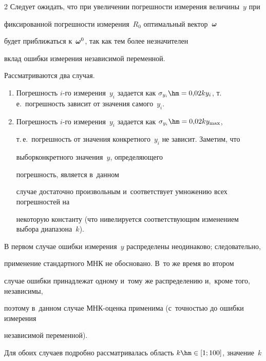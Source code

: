 \begin{multicols}{2}
Следует ожидать, что при увеличении погрешности измерения величины~$y$ при

фиксированной погрешности измерения~$R_0$ оптимальный вектор~$\boldsymbol{\omega}$

будет приближаться к~$\boldsymbol{\omega}^0$, так как тем более незначителен

вклад ошибки измерения независимой переменной.



Рассматриваются два случая.

\begin{enumerate}

  \item Погрешность $i$-го измерения~$y_i$ задается как $\sigma_{y_i} \hm= 

0{,}02ky_i$, т.\,е.\     погрешность зависит от значения самого~$y_i$.

  \item Погрешность $i$-го измерения~$y_i$ задается как $\sigma_{y_i} \hm= 

0{,}02ky_{\max}$,

    т.\,е.\ погрешность от значения конкретного~$y_i$ не зависит. Заметим, что 

выбор\linebreak конкретного значения~$y$, определяющего %

погрешность, является в~данном 

случае  достаточ\-но произвольным и~соответствует умножению всех погрешностей на 

некоторую константу     (что нивелируется соответствующим изменением выбора диапазона~$k$).

\end{enumerate}



В первом случае ошибки измерения~$y$ распределены неодинаково; следовательно, 

применение стандартного МНК не обосно\-ва\-но. В~то же время во втором 

случае ошибки принадлежат одному и~тому же распределению и,~кроме того, независимы, 

поэтому в~данном случае МНК-оцен\-ка применима (с~точностью до ошибки измерения 

независимой переменной).



Для обоих случаев подробно рассматривалась область $k\hm \in [1; 100]$, значение~$k$


\end{multicols}
